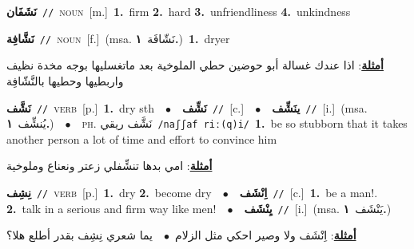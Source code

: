 \documentclass[10pt,a4paper,twoside]{article} %
\begin{document}
\begin{multicols}{2}
{\setlength\topsep{0pt}\textbf{\foreignlanguage{arabic}{نَشَفَان}}\ {\color{gray}\texttt{//}\color{black}}\ \textsc{noun}\ [m.]\ \textbf{1.}~firm  \textbf{2.}~hard  \textbf{3.}~unfriendliness  \textbf{4.}~unkindness\ } \vspace{2mm}

{\setlength\topsep{0pt}\textbf{\foreignlanguage{arabic}{نَشَّافِة}}\ {\color{gray}\texttt{//}\color{black}}\ \textsc{noun}\ [f.]\ \color{gray}(msa. \foreignlanguage{arabic}{نَشّافَة}~\foreignlanguage{arabic}{\textbf{١.}})\color{black}\ \textbf{1.}~dryer\  \begin{flushright}\color{gray}\foreignlanguage{arabic}{\textbf{\underline{\foreignlanguage{arabic}{أمثلة}}}: اذا عندك غسالة أبو حوضين حطي الملوخية بعد ماتغسليها بوجه مخدة نظيف واربطيها وحطيها بالنَّشّافِة}\end{flushright}\color{black}} \vspace{2mm}

{\setlength\topsep{0pt}\textbf{\foreignlanguage{arabic}{نَشَّف}}\ {\color{gray}\texttt{//}\color{black}}\ \textsc{verb}\ [p.]\ \textbf{1.}~dry sth\ \ $\bullet$\ \ \setlength\topsep{0pt}\textbf{\foreignlanguage{arabic}{نَشِّف}}\ {\color{gray}\texttt{//}\color{black}}\ [c.]\ \ $\bullet$\ \ \setlength\topsep{0pt}\textbf{\foreignlanguage{arabic}{ينَشِّف}}\ {\color{gray}\texttt{//}\color{black}}\ [i.]\ \color{gray}(msa. \foreignlanguage{arabic}{يُنشِّف}~\foreignlanguage{arabic}{\textbf{١.}})\color{black}\ \ $\bullet$\ \ \textsc{ph.} \color{gray} \foreignlanguage{arabic}{نَشَّف ريقي}\color{black}\ {\color{gray}\texttt{/{\sffamily naʃʃaf riː(q)i}/}\color{black}}\ \textbf{1.}~be so stubborn that it takes another person a lot of time and effort to convince him\  \begin{flushright}\color{gray}\foreignlanguage{arabic}{\textbf{\underline{\foreignlanguage{arabic}{أمثلة}}}: امي بدها تنشِّفلي زعتر ونعناع وملوخية}\end{flushright}\color{black}} \vspace{2mm}

{\setlength\topsep{0pt}\textbf{\foreignlanguage{arabic}{نِشِف}}\ {\color{gray}\texttt{//}\color{black}}\ \textsc{verb}\ [p.]\ \textbf{1.}~dry  \textbf{2.}~become dry\ \ $\bullet$\ \ \setlength\topsep{0pt}\textbf{\foreignlanguage{arabic}{اِنْشَف}}\ {\color{gray}\texttt{//}\color{black}}\ [c.]\ \textbf{1.}~be a man!.  \textbf{2.}~talk in a serious and firm way like men!\ \ $\bullet$\ \ \setlength\topsep{0pt}\textbf{\foreignlanguage{arabic}{يِنْشَف}}\ {\color{gray}\texttt{//}\color{black}}\ [i.]\ \color{gray}(msa. \foreignlanguage{arabic}{يَنْشَف}~\foreignlanguage{arabic}{\textbf{١.}})\color{black}\  \begin{flushright}\color{gray}\foreignlanguage{arabic}{\textbf{\underline{\foreignlanguage{arabic}{أمثلة}}}: اِنْشَف ولا وصير احكي مثل الزلام\ $\bullet$\ \  يما شعري نِشِف بقدر أطلع هلا؟}\end{flushright}\color{black}} \vspace{2mm}


\end{multicols}
\end{document}

